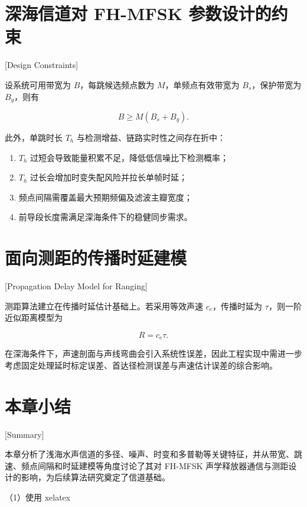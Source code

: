 \section{深海信道对 FH-MFSK 参数设计的约束}[Design Constraints]

设系统可用带宽为 $B$，每跳候选频点数为 $M$，单频点有效带宽为 $B_s$，保护带宽为 $B_g$，则有

\begin{equation}
  B \geq M(B_s + B_g).
  \label{eq:bandwidth_constraint}
\end{equation}

此外，单跳时长 $T_h$ 与检测增益、链路实时性之间存在折中：

\begin{enumerate}
  \item $T_h$ 过短会导致能量积累不足，降低低信噪比下检测概率；
  \item $T_h$ 过长会增加时变失配风险并拉长单帧时延；
  \item 频点间隔需覆盖最大预期频偏及滤波主瓣宽度；
  \item 前导段长度需满足深海条件下的稳健同步需求。
\end{enumerate}

\section{面向测距的传播时延建模}[Propagation Delay Model for Ranging]

测距算法建立在传播时延估计基础上。若采用等效声速 $c_e$，传播时延为 $\tau$，则一阶近似距离模型为

\begin{equation}
  R = c_e\tau.
  \label{eq:simple_range}
\end{equation}

在深海条件下，声速剖面与声线弯曲会引入系统性误差，因此工程实现中需进一步考虑固定处理延时标定误差、首达径检测误差与声速估计误差的综合影响\cite{sunRelationshipPropagationTime2019,bergerStratificationEffectCompensation2008}。

\section*{本章小结}[Summary]

本章分析了浅海水声信道的多径、噪声、时变和多普勒等关键特征，并从带宽、跳速、频点间隔和时延建模等角度讨论了其对 FH-MFSK 声学释放器通信与测距设计的影响，为后续算法研究奠定了信道基础。

（1）使用 xelatex

